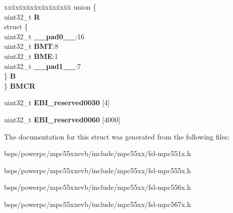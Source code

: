 \begin{DoxyCompactItemize}
\begin{tabbing}
\end{tabbing}\item 
\mbox{\label{structEBI__tag_ae4bd03c45c6d57614f319a03c4b343e9}} 
\begin{tabbing}
xx\=xx\=xx\=xx\=xx\=xx\=xx\=xx\=xx\=\kill
union \{\\
\>uint32\_t {\bfseries R}\\
\>struct \{\\
\>\>uint32\_t {\bfseries \_\_pad0\_\_}:16\\
\>\>uint32\_t {\bfseries BMT}:8\\
\>\>uint32\_t {\bfseries BME}:1\\
\>\>uint32\_t {\bfseries \_\_pad1\_\_}:7\\
\>\} {\bfseries B}\\
\} {\bfseries BMCR}\\

\end{tabbing}\item 
\mbox{\label{structEBI__tag_a8815d59ae270101aa34ea15773572950}} 
uint32\+\_\+t {\bfseries E\+B\+I\+\_\+reserved0030} \mbox{[}4\mbox{]}
\item 
\mbox{\label{structEBI__tag_a1da2b6ccaaac3aa52c98e14f858aa4a7}} 
uint32\+\_\+t {\bfseries E\+B\+I\+\_\+reserved0060} \mbox{[}4000\mbox{]}
\end{DoxyCompactItemize}


The documentation for this struct was generated from the following files\+:\begin{DoxyCompactItemize}
\item 
bsps/powerpc/mpc55xxevb/include/mpc55xx/fsl-\/mpc551x.\+h\item 
bsps/powerpc/mpc55xxevb/include/mpc55xx/fsl-\/mpc555x.\+h\item 
bsps/powerpc/mpc55xxevb/include/mpc55xx/fsl-\/mpc556x.\+h\item 
bsps/powerpc/mpc55xxevb/include/mpc55xx/fsl-\/mpc567x.\+h\end{DoxyCompactItemize}
